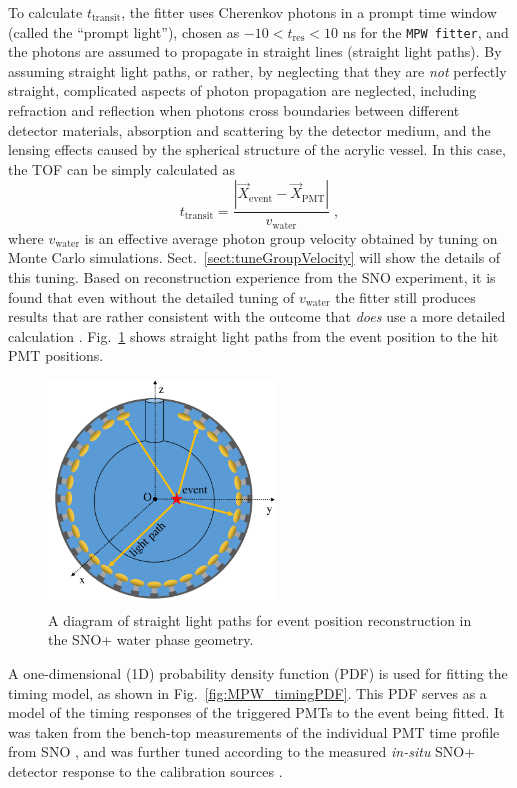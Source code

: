 To calculate $t_{\mathrm{transit}}$, the fitter uses Cherenkov photons in a prompt time window (called the ``prompt light''), chosen as $-10<t_{\mathrm{res}}<10$ ns for the \texttt{MPW fitter}, and the photons are assumed to propagate in straight lines (straight light paths). By assuming straight light paths, or rather, by neglecting that they are {\em not} perfectly straight, complicated aspects of photon propagation are neglected, including refraction and reflection when photons cross boundaries between different detector materials, absorption and scattering by the detector medium, and the lensing effects caused by the spherical structure of the acrylic vessel. In this case, the TOF can be simply calculated as 
\begin{equation*}
t_{\mathrm{transit}}=\frac{|\vec{X}_{\mathrm{event}}-\vec{X}_{\mathrm{PMT}}|}{v_{\mathrm{water}}} \; , 
\end{equation*}
where $v_{\mathrm{water}}$ is an effective average photon group velocity obtained by tuning on Monte Carlo simulations. Sect.~\ref{sect:tuneGroupVelocity} will show the details of this tuning. Based on reconstruction experience from the SNO experiment, it is found that even without the detailed tuning of $v_{\mathrm{water}}$ the fitter still produces results that are rather consistent with the outcome that {\em does} use a more detailed calculation \cite{jones2011background,boulay2004direct}. Fig.~\ref{mpwdiagram_position} shows straight light paths from the event position to the hit PMT positions.
\begin{figure}[htbp]
	\centering
   \includegraphics[width=6cm]{mpwDiagram_coord.png}
	\caption[Straight light path calculation in the water geometry.]{A diagram of straight light paths for event position reconstruction in the SNO+ water phase geometry.}
	\label{mpwdiagram_position}
\end{figure}

A one-dimensional (1D) probability density function (PDF) is used for fitting the timing model, as shown in Fig.~\ref{fig:MPW_timingPDF}. This PDF serves as a model of the timing responses of the triggered PMTs to the event being fitted. It was taken from the bench-top measurements of the individual PMT time profile from SNO \cite{jillings1996photomultiplier}, and was further tuned according to the measured \emph{in-situ} SNO+ detector response to the calibration sources \cite{anderson2021optical}.

